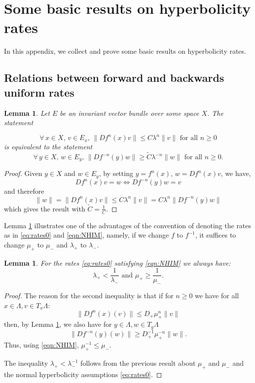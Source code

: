 \documentclass[11pt]{amsart}
\newtheorem{lem}[thm]{Lemma}
\theoremstyle{definition}
\theoremstyle{remark}
\numberwithin{equation}{section}
\begin{document}
\section{Some basic results on hyperbolicity rates}\label{sec:NHIM_results}
In this appendix, we collect and prove  some basic results on
hyperbolicity rates.


\subsection{Relations between forward and backwards uniform rates}

\begin{lem}\label{lem:rates_inverses}
Let $E$ be an invariant vector bundle over some space $X$. The statement

\[
\forall\, x\in X,\, v\in E_x,\,\|Df^n(x)v\|\leq C\lambda^n \|v\|\textrm{ for all $n\geq 0$}
\]
is equivalent to the statement
\[
\forall\, y\in X,\,  w\in E_y,\, \|Df^{-n}(y)w\|\ge \tilde{C}\lambda^{-n} \|w\|\textrm{ for all $n\geq 0$}.
\]
\end{lem}
\begin{proof}
Given $y\in X$ and $w\in E_y$, by setting $y=f^n(x)$, $w=Df^n(x)v$, we have,
\[
Df^n(x)v=w \Leftrightarrow Df^{-n}(y)w =v
\]
and therefore
\[
\|w\|=\|Df^n(x)v\|\leq C\lambda^n \|v\|= C\lambda^n \|Df^{-n}(y)w\|
\]
which gives the result with $\tilde C=\frac{1}{C}$.
\end{proof}


Lemma \ref{lem:rates_inverses} illustrates one of the advantages of the convention of denoting the rates as in \eqref{eq:rates0} and \eqref{eqn:NHIM}, namely,   if we change $f$ to $f^{-1}$, it suffices to change $\mu_+$ to $\mu_-$ and $\lambda_+$ to $\lambda_-$.



\begin{lem}\label{rem:ratesplusminus}
For the rates \eqref{eq:rates0}  satisfying \eqref{eqn:NHIM} we always have:
\begin{equation}\label{eq:rem_ratesplusminus}
  \lambda_+ <\frac{1}{\lambda_-} \textrm { and }
\mu_+ \ge  \frac{1}{\mu_-}.
\end{equation}
\end{lem}
\begin{proof}
The reason for the second inequality is that if
for   $n\geq 0$ we have  for all $x\in \Lambda, v \in T_x\Lambda$:
\[
\| Df^n(x)(v)\|  \leq D_+\mu_+^n\|v\|
\]
then, by Lemma \ref{lem:rates_inverses}, we also have for  $y\in \Lambda, w \in T_y\Lambda$
\[
\| Df^{-n}(y)(w)\| \geq D_+^{-1}\mu_+^{-n}\|w\|.
\]
Thus, using \eqref{eqn:NHIM}, $\mu_+^{-1}\le \mu_- $.

The inequality $\lambda_+ < \lambda_- ^{-1}$ follows from the previous result about $\mu_+$ and $\mu_-$ and  the normal hyperbolicity
assumptions \eqref{eq:rates0}.
\end{proof}
\end{document}
